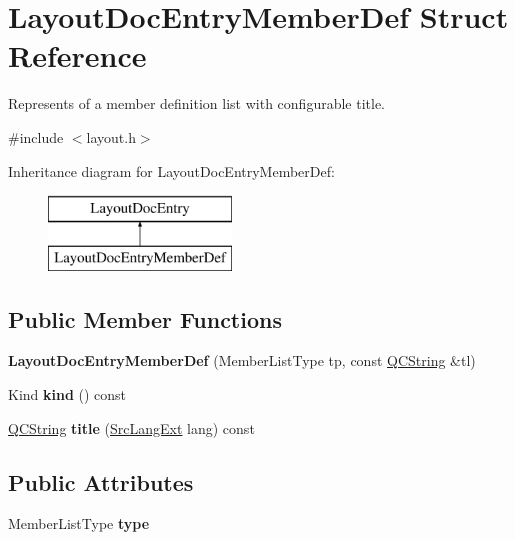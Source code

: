 \hypertarget{struct_layout_doc_entry_member_def}{}\section{Layout\+Doc\+Entry\+Member\+Def Struct Reference}
\label{struct_layout_doc_entry_member_def}


Represents of a member definition list with configurable title.  




{\ttfamily \#include $<$layout.\+h$>$}

Inheritance diagram for Layout\+Doc\+Entry\+Member\+Def\+:\begin{figure}[H]
\begin{center}
\leavevmode
\includegraphics[height=2.000000cm]{struct_layout_doc_entry_member_def}
\end{center}
\end{figure}
\subsection*{Public Member Functions}
\begin{DoxyCompactItemize}
\item 
\mbox{\label{struct_layout_doc_entry_member_def_ad362098564d3956bc5f596021afd7464}} 
{\bfseries Layout\+Doc\+Entry\+Member\+Def} (Member\+List\+Type tp, const \mbox{\hyperlink{class_q_c_string}{Q\+C\+String}} \&tl)
\item 
\mbox{\label{struct_layout_doc_entry_member_def_a914a5a2b69f5c40fc0aa8cb0316ac5f6}} 
Kind {\bfseries kind} () const
\item 
\mbox{\label{struct_layout_doc_entry_member_def_aad1a0162e48008f3ff91f4a3330c06be}} 
\mbox{\hyperlink{class_q_c_string}{Q\+C\+String}} {\bfseries title} (\mbox{\hyperlink{types_8h_a9974623ce72fc23df5d64426b9178bf2}{Src\+Lang\+Ext}} lang) const
\end{DoxyCompactItemize}
\subsection*{Public Attributes}
\begin{DoxyCompactItemize}
\item 
\mbox{\label{struct_layout_doc_entry_member_def_a2c77d5fc0d714e32ef1b282e67c338d3}} 
Member\+List\+Type {\bfseries type}
\end{DoxyCompactItemize}
